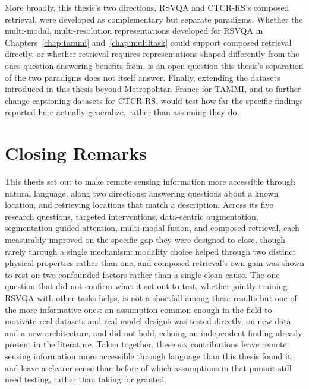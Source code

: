 More broadly, this thesis's two directions, RSVQA and CTCR-RS's composed retrieval, were developed as complementary but separate paradigms. Whether the multi-modal, multi-resolution representations developed for RSVQA in Chapters~\ref{chap:tammi} and~\ref{chap:multitask} could support composed retrieval directly, or whether retrieval requires representations shaped differently from the ones question answering benefits from, is an open question this thesis's separation of the two paradigms does not itself answer. Finally, extending the datasets introduced in this thesis beyond Metropolitan France for TAMMI, and to further change captioning datasets for CTCR-RS, would test how far the specific findings reported here actually generalize, rather than assuming they do.

\section{Closing Remarks}
\label{sec:conclusion_closing}

This thesis set out to make remote sensing information more accessible through natural language, along two directions: answering questions about a known location, and retrieving locations that match a description. Across its five research questions, targeted interventions, data-centric augmentation, segmentation-guided attention, multi-modal fusion, and composed retrieval, each measurably improved on the specific gap they were designed to close, though rarely through a single mechanism: modality choice helped through two distinct physical properties rather than one, and composed retrieval's own gain was shown to rest on two confounded factors rather than a single clean cause. The one question that did not confirm what it set out to test, whether jointly training RSVQA with other tasks helps, is not a shortfall among these results but one of the more informative ones: an assumption common enough in the field to motivate real datasets and real model designs was tested directly, on new data and a new architecture, and did not hold, echoing an independent finding already present in the literature. Taken together, these six contributions leave remote sensing information more accessible through language than this thesis found it, and leave a clearer sense than before of which assumptions in that pursuit still need testing, rather than taking for granted.